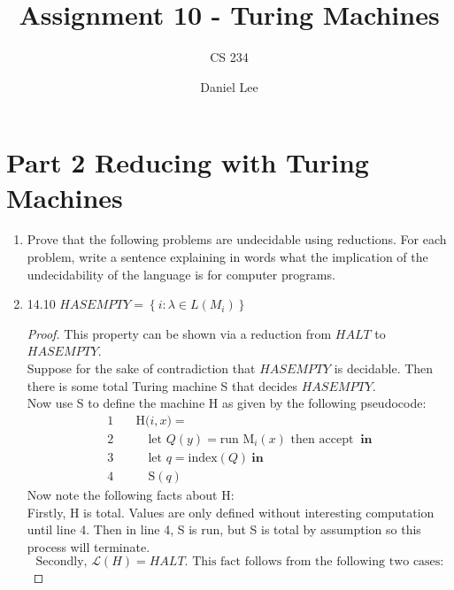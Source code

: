 \documentclass[10pt]{article}
\title{Assignment 10 - Turing Machines}
\author{CS 234}
\date{Daniel Lee}
\begin{document}
\maketitle

\section*{Part 2 \quad Reducing with Turing Machines}

\begin{enumerate}[label={}]
      \item Prove that the following problems are undecidable using reductions. For each problem, write a sentence explaining in words what the implication of the undecidability of the language is for computer programs.\\
      \item 14.10 $H A S E M P T Y=\left\{i: \lambda \in L\left(M_i\right)\right\}$

            \begin{proof}
                  This property can be shown via a reduction from $HALT$ to $HASEMPTY$.\\
                  Suppose for the sake of contradiction that $HASEMPTY$ is decidable.
                  Then there is some total Turing machine S that decides $HASEMPTY$.\\
                  Now use S to define the machine H as given by the following pseudocode:
                  $$\begin{aligned}
                              1 \quad & \text{H(}i, x\text{)} =                                                              \\
                              2 \quad & \quad \text{let } Q(y) = \text{run }\text{M}_i(x) \text{ then accept } \ \textbf{in} \\
                              3 \quad & \quad \text{let } q = \text{index}(Q) \ \textbf{in}                                  \\
                              4 \quad & \quad \text{S}(q)
                        \end{aligned}$$
                  Now note the following facts about H:\\
                  Firstly, H is total. Values are only defined without interesting computation
                  until line 4. Then in line 4, S is run, but S is total by assumption so this process
                  will terminate.
                  $$\text { Secondly, } \mathcal{L}(H)=H A L T \text {. This fact follows from the following two cases: }$$


\end{proof}
\end{enumerate}
\end{document}
